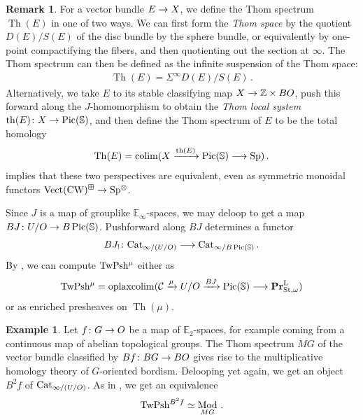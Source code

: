 \documentclass[10pt]{amsart}
\numberwithin{equation}{section}
\theoremstyle{definition}
\newtheorem{ex}[prop]{Example}
\newtheorem{rem}[prop]{Remark}
\DeclareMathOperator{\Pic}{Pic}
\DeclareMathOperator{\Th}{Th}
\DeclareMathOperator{\Mod}{Mod}
\DeclareMathOperator{\St}{St}
\DeclareMathOperator{\Vect}{Vect}
\DeclareMathOperator{\thom}{th}
\DeclareMathOperator{\CW}{CW}
\DeclareMathOperator*{\colim}{colim}
\DeclareMathOperator*{\oplaxcolim}{oplaxcolim}
\newcommand{\bfPr}{\mathbf{Pr}}
\newcommand{\rL}{\mathrm{L}}
\newcommand{\TwShv}{\mathrm{TwPsh}\vphantom{h}}
\newcommand{\Cat}{\mathrm{Cat}\vphantom{t}}
\newcommand{\bE}{\mathbb{E}}
\newcommand{\bS}{\mathbb{S}}
\newcommand{\bZ}{\mathbb{Z}}
\newcommand{\cC}{\mathcal{C}}
\newcommand{\Sp}{\mathrm{Sp}\vphantom{p}}
\renewcommand{\to}{\mathchoice{\longrightarrow}{\rightarrow}{}{}}
\begin{document}
\begin{rem}\label{rem:thom_spectra}
	For a vector bundle $E\to X$, we define the Thom spectrum $\Th(E)$ in one of two ways.
  We can first form the \emph{Thom space} by the quotient $D(E)/S(E)$ of the disc bundle by the sphere bundle, or equivalently by one-point compactifying the fibers, and then quotienting out the section at $\infty$.
  The Thom spectrum can then be defined as the infinite suspension of the Thom space:
	\begin{align*}
		\Th(E) = \Sigma^{\infty} D(E)/S(E) \,.
	\end{align*}
	Alternatively, we take $E$ to its stable classifying map $X\to \bZ\times BO$, push this forward along the $J$-homomorphism to obtain the \emph{Thom local system} $\thom(E)\colon X\to \Pic(\bS)$, and then define the Thom spectrum of $E$ to be the total homology
	\begin{align*}
		\Th(E) = \colim(X\xrightarrow{\thom(E)} \Pic(\bS)\to \Sp ) \,.
	\end{align*}
	 implies that these two perspectives are equivalent, even as symmetric monoidal functors $\Vect(\CW)^{\boxplus} \to \Sp^{\otimes}$.
\end{rem}

Since $J$ is a map of grouplike $\bE_{\infty}$-spaces, we may deloop to get a map $BJ\colon U/O \to B\Pic(\bS)$. Pushforward along $BJ$ determines a functor
\begin{align*}
	BJ_{!}\colon \Cat_{\infty/ (U/O) } \to \Cat_{\infty/B\Pic(\bS)} \,.
\end{align*}
By , we can compute $\TwShv^{\mu}$ either as
\begin{align*}
	\TwShv^{\mu} = \oplaxcolim(\cC \xrightarrow{\mu} U/O \xrightarrow{BJ} \Pic(\bS) \to \bfPr^{\rL}_{\St,\omega} )
\end{align*}
or as enriched presheaves on $\Th(\mu)$.
\begin{ex}
	Let $f\colon G \to O$ be a map of $\bE_{2}$-spaces, for example coming from a continuous map of abelian topological groups.
  The Thom spectrum $MG$ of the vector bundle classified by $Bf\colon BG\to BO$ gives rise to the multiplicative homology theory of $G$-oriented bordism.
  Delooping yet again, we get an object $B^{2}f$ of $\Cat_{\infty / (U/O)}$.
  As in , we get an equivalence
	\begin{align*}
		\TwShv^{B^{2}f} \simeq \Mod_{MG} \,.
	\end{align*}
\end{ex}
\end{document}
